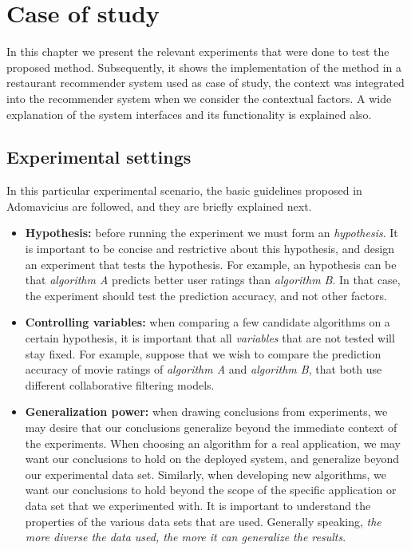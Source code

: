 \chapter{Case of study} \label{case}

In this chapter we present the relevant experiments that were done to
test the proposed method. Subsequently, it shows the implementation of
the method in a restaurant recommender system used as case of study, 
the context was integrated into the recommender system when   
we consider the contextual factors. A wide explanation of the system  
interfaces and its functionality is explained also.

\section{Experimental settings} 

In this particular experimental scenario, the basic guidelines 
proposed in Adomavicius  \cite{adomavicius2011context} are followed,  
and they are briefly explained next. 
\begin{itemize} 
\item \textbf{Hypothesis:} before running the experiment we must form
an \textit{hypothesis}. It is important to be concise and restrictive
about this hypothesis, and design an experiment that tests the
hypothesis. For example, an hypothesis can be that  \textit{algorithm
A} predicts better user ratings than  \textit{algorithm B}.  In that
case, the experiment should test the prediction accuracy, and not
other factors.
\item \textbf{Controlling variables:} when comparing a few candidate
algorithms on a certain hypothesis, it is important that all
\textit{variables} that are not tested will stay fixed. For example,
suppose that we wish to compare the prediction accuracy of movie
ratings of  \textit{algorithm A} and \textit{algorithm B}, that both
use different collaborative filtering models.
\item \textbf{Generalization power:} when drawing conclusions from
experiments, we may desire that our conclusions generalize beyond the
immediate context of the experiments. When choosing an algorithm for a
real application, we may want our conclusions to hold on the deployed
system, and generalize beyond our experimental data set. Similarly,
when developing new algorithms, we want our conclusions to hold beyond
the scope of the specific application or data set that we experimented
with. It is important to understand the properties of the various data
sets that are used. Generally speaking, \textit{the more diverse the
data used, the more it can generalize the results}.
\end{itemize} 

